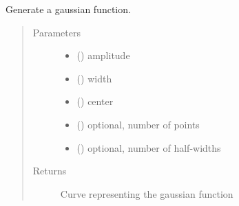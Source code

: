 \documentclass[letterpaper,10pt,english]{sphinxmanual}
\begin{document}
\begin{fulllineitems}
\label{\detokenize{pydv:pydvpy.gaussian}}
Generate a gaussian function.

\begin{sphinxVerbatim}[commandchars=\\\{\}]
    
\end{sphinxVerbatim}

\begin{sphinxVerbatim}[commandchars=\\\{\}]
  
\end{sphinxVerbatim}
\begin{quote}\begin{description}
\item[{Parameters}] \leavevmode\begin{itemize}
\item {} 
 () \textendash{} amplitude

\item {} 
 () \textendash{} width

\item {} 
 () \textendash{} center

\item {} 
 () \textendash{} optional, number of points

\item {} 
 () \textendash{} optional, number of half-widths

\end{itemize}

\item[{Returns}] \leavevmode
Curve \textendash{} representing the gaussian function

\end{description}\end{quote}

\end{fulllineitems}
\end{document}
